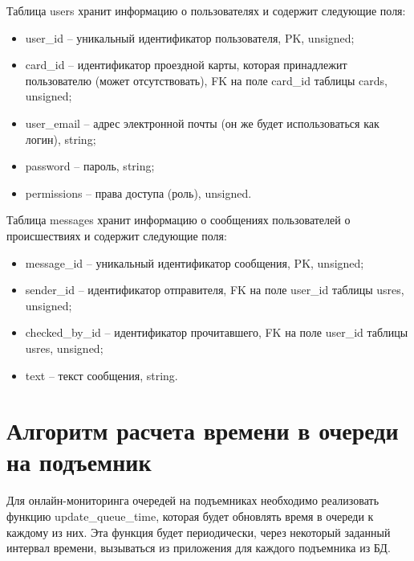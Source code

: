 Таблица users хранит информацию о пользователях и содержит следующие поля:
\begin{itemize}
	\item user\_id -- уникальный идентификатор пользователя, PK, unsigned;
	\item card\_id -- идентификатор проездной карты, которая принадлежит пользователю (может отсутствовать), FK на поле card\_id таблицы cards, unsigned;
	\item user\_email -- адрес электронной почты (он же будет использоваться как логин), string;
	\item password -- пароль, string;
	\item permissions -- права доступа (роль), unsigned.
\end{itemize}


Таблица messages хранит информацию о сообщениях пользователей о происшествиях и содержит следующие поля:
\begin{itemize}
	\item message\_id -- уникальный идентификатор сообщения, PK, unsigned;
	\item sender\_id -- идентификатор отправителя, FK на поле user\_id таблицы usres, unsigned;
	\item checked\_by\_id -- идентификатор прочитавшего, FK на поле user\_id таблицы usres, unsigned;
	\item text -- текст сообщения, string.	
\end{itemize}




\section{Алгоритм расчета времени в очереди на подъемник}\label{func_label}






Для онлайн-мониторинга очередей на подъемниках необходимо реализовать функцию update\_queue\_time, которая будет обновлять время в очереди к каждому из них. Эта функция будет периодически, через некоторый заданный интервал времени, вызываться из приложения для каждого подъемника из БД. 

